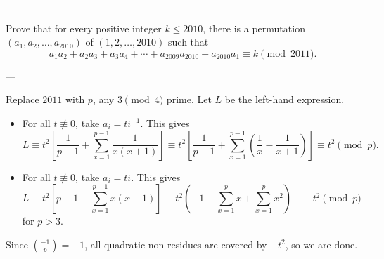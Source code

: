 
---

Prove that for every positive integer $k\le2010$, there is a permutation $(a_1,a_2,\ldots,a_{2010})$ of $(1,2,\ldots,2010)$ such that \[a_1a_2+a_2a_3+a_3a_4+\cdots+a_{2009}a_{2010}+a_{2010}a_1\equiv k\pmod{2011}.\]

---

Replace $2011$ with $p$, any $3\pmod4$ prime. Let $L$ be the left-hand expression.
\begin{itemize}
    \item For all $t\not\equiv0$, take $a_i=ti^{-1}$. This gives\[L\equiv t^2\left[\frac1{p-1}+\sum_{x=1}^{p-1}\frac1{x(x+1)}\right]\equiv t^2\left[\frac1{p-1}+\sum_{x=1}^{p-1}\left(\frac1x-\frac1{x+1}\right)\right]\equiv t^2\pmod p.\]

    \item For all $t\not\equiv0$, take $a_i=ti$. This gives\[L\equiv t^2\left[p-1+\sum_{x=1}^{p-1}x(x+1)\right]\equiv t^2\left(-1+\sum_{x=1}^p x+\sum_{x=1}^p x^2\right)\equiv -t^2\pmod p\]for $p>3$.
\end{itemize}
Since $\left(\frac{-1}p\right)=-1$, all quadratic non-residues are covered by $-t^2$, so we are done.

